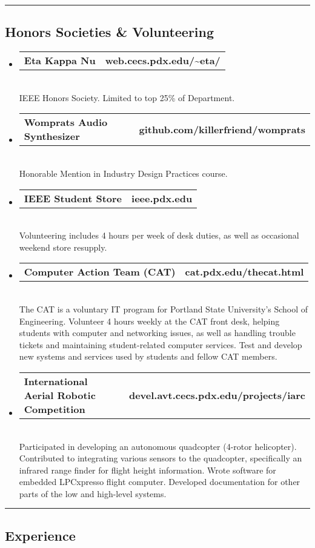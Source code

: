 \documentclass[10pt,letterpaper]{article}
\makeatletter
\newcommand{\headerrow}[2]
{\begin{tabular*}{\linewidth}{l@{\extracolsep{\fill}}r}
	#1 &
	#2 \\
\end{tabular*}}
\makeatother
\begin{document}
\newpage

\hrule
\vspace{-0.4em}
\subsection*{Honors Societies \& Volunteering}
\begin{itemize}
  \item
	\headerrow
		{\textbf{Eta Kappa Nu}}
		{\textbf{web.cecs.pdx.edu/\textasciitilde eta/}}
	\\
  IEEE Honors Society. Limited to top 25\% of Department.

  \item
	\headerrow
		{\textbf{Womprats Audio Synthesizer}}
		{\textbf{github.com/killerfriend/womprats}}
	\\
  Honorable Mention in Industry Design Practices course.
  
  \item
	\headerrow
		{\textbf{IEEE Student Store}}
		{\textbf{ieee.pdx.edu}}
	\\
  Volunteering includes 4 hours per week of desk duties, as well as occasional weekend store resupply.

  \item
  \headerrow
    {\textbf{Computer Action Team (CAT)}}
		{\textbf{cat.pdx.edu/thecat.html}}
	\\
  The CAT is a voluntary IT program for Portland State University's School of Engineering. Volunteer 4 hours weekly at the CAT front desk, helping students with computer and networking issues, as well as handling trouble tickets and maintaining student-related computer services. Test and develop new systems and services used by students and fellow CAT members. 

  \item
  \headerrow
    {\textbf{International Aerial Robotic Competition}}
		{\textbf{devel.avt.cecs.pdx.edu/projects/iarc}}
	\\
  Participated in developing an autonomous quadcopter (4-rotor helicopter). Contributed to integrating various sensors to the quadcopter, specifically an infrared range finder for flight height information. Wrote software for embedded LPCxpresso flight computer. Developed documentation for other parts of the low and high-level systems.
\end{itemize}

\hrule
\vspace{-0.4em}
\subsection*{Experience}
\end{document}
